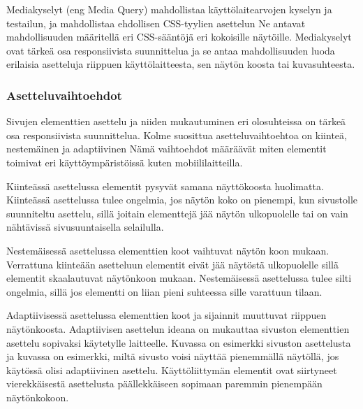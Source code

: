 \documentclass[11pt,a4paper,titlepage,oneside]{article}
\begin{document}
Mediakyselyt (eng Media Query) mahdollistaa käyttölaitearvojen kyselyn ja testailun,
ja mahdollistaa ehdollisen CSS-tyylien asettelun
Ne antavat mahdollisuuden määritellä eri CSS-sääntöjä eri kokoisille näytöille. 
Mediakyselyt ovat tärkeä osa responsiivista suunnittelua ja se antaa mahdollisuuden luoda erilaisia asetteluja riippuen käyttölaitteesta,
sen näytön koosta tai kuvasuhteesta.












\subsubsection{Asetteluvaihtoehdot}





Sivujen elementtien asettelu ja niiden mukautuminen eri olosuhteissa on tärkeä osa responsiivista suunnittelua.
Kolme suosittua asetteluvaihtoehtoa on kiinteä, nestemäinen ja adaptiivinen
Nämä vaihtoehdot määräävät miten elementit toimivat eri käyttöympäristöissä kuten mobiililaitteilla.
\medskip



Kiinteässä asettelussa elementit pysyvät samana näyttökoosta huolimatta. 
Kiinteässä asettelussa tulee ongelmia, jos näytön koko on pienempi, kun sivustolle suunniteltu asettelu, 
sillä joitain elementtejä jää näytön ulkopuolelle tai on vain nähtävissä sivusuuntaisella selailulla.
\medskip


Nestemäisessä asettelussa elementtien koot vaihtuvat näytön koon mukaan. 
Verrattuna kiinteään asetteluun elementit eivät jää näytöstä ulkopuolelle sillä elementit skaalautuvat näytönkoon mukaan.
Nestemäisessä asettelussa tulee silti ongelmia, sillä jos elementti on liian pieni suhteessa sille varattuun tilaan.
\medskip


Adaptiivisessä asettelussa elementtien koot ja sijainnit muuttuvat riippuen näytönkoosta.
Adaptiivisen asettelun ideana on mukauttaa sivuston elementtien asettelu sopivaksi käytetylle laitteelle.
Kuvassa \nextImageCount {} on esimerkki sivuston asettelusta ja
kuvassa \nextnextImageCount{} on esimerkki, miltä sivusto voisi näyttää pienemmällä näytöllä, jos käytössä olisi adaptiivinen asettelu.
Käyttöliittymän elementit ovat siirtyneet vierekkäisestä asettelusta päällekkäiseen sopimaan paremmin pienempään näytönkokoon.
\medskip
\end{document}
